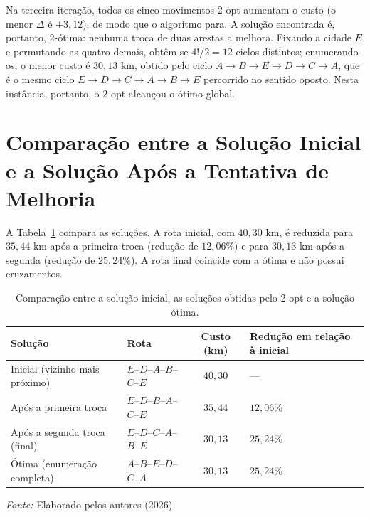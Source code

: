 Na terceira iteração, todos os cinco movimentos 2-opt aumentam o custo (o menor $\Delta$ é $+3{,}12$), de modo que o algoritmo para. A solução encontrada é, portanto, 2-ótima: nenhuma troca de duas arestas a melhora. Fixando a cidade $E$ e permutando as quatro demais, obtêm-se $4!/2 = 12$ ciclos distintos; enumerando-os, o menor custo é $30{,}13$ km, obtido pelo ciclo $A \rightarrow B \rightarrow E \rightarrow D \rightarrow C \rightarrow A$, que é o mesmo ciclo $E \rightarrow D \rightarrow C \rightarrow A \rightarrow B \rightarrow E$ percorrido no sentido oposto. Nesta instância, portanto, o 2-opt alcançou o ótimo global.

\section{Comparação entre a Solução Inicial e a Solução Após a Tentativa de Melhoria}

A Tabela~\ref{tab:comparacao-2opt} compara as soluções. A rota inicial, com $40{,}30$ km, é reduzida para $35{,}44$ km após a primeira troca (redução de $12{,}06\%$) e para $30{,}13$ km após a segunda (redução de $25{,}24\%$). A rota final coincide com a ótima e não possui cruzamentos.

\begin{table}[htb]
\centering
\caption{Comparação entre a solução inicial, as soluções obtidas pelo 2-opt e a solução ótima.}
\label{tab:comparacao-2opt}
\small
\renewcommand{\arraystretch}{1.25}
\begin{tabular}{|>{\raggedright\arraybackslash}p{4.4cm}|>{\raggedright\arraybackslash}p{3.6cm}|c|>{\raggedright\arraybackslash}p{3.2cm}|}
\hline
\rowcolor{gray!20}
\textbf{Solução} & \textbf{Rota} & \textbf{Custo (km)} & \textbf{Redução em relação à inicial} \\ \hline
Inicial (vizinho mais próximo) & $E$--$D$--$A$--$B$--$C$--$E$ & $40{,}30$ & --- \\ \hline
Após a primeira troca & $E$--$D$--$B$--$A$--$C$--$E$ & $35{,}44$ & $12{,}06\%$ \\ \hline
Após a segunda troca (final) & $E$--$D$--$C$--$A$--$B$--$E$ & $30{,}13$ & $25{,}24\%$ \\ \hline
Ótima (enumeração completa) & $A$--$B$--$E$--$D$--$C$--$A$ & $30{,}13$ & $25{,}24\%$ \\ \hline
\end{tabular}

\footnotesize{\textit{Fonte:} Elaborado pelos autores (2026)}
\end{table}

